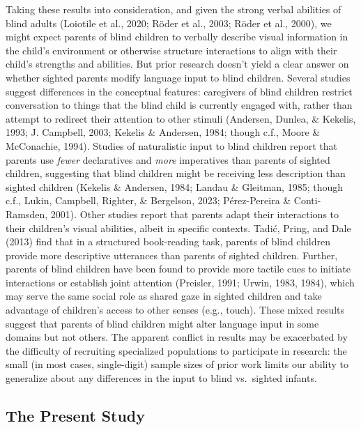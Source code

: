 \documentclass[
  man,floatsintext]{apa6}
\begin{document}
Taking these results into consideration, and given the strong verbal abilities of blind adults (Loiotile et al., 2020; Röder et al., 2003; Röder et al., 2000), we might expect parents of blind children to verbally describe visual information in the child's environment or otherwise structure interactions to align with their child's strengths and abilities. But prior research doesn't yield a clear answer on whether sighted parents modify language input to blind children. Several studies suggest differences in the conceptual features: caregivers of blind children restrict conversation to things that the blind child is currently engaged with, rather than attempt to redirect their attention to other stimuli (Andersen, Dunlea, \& Kekelis, 1993; J. Campbell, 2003; Kekelis \& Andersen, 1984; though c.f., Moore \& McConachie, 1994). Studies of naturalistic input to blind children report that parents use \emph{fewer} declaratives and \emph{more} imperatives than parents of sighted children, suggesting that blind children might be receiving less description than sighted children (Kekelis \& Andersen, 1984; Landau \& Gleitman, 1985; though c.f., Lukin, Campbell, Righter, \& Bergelson, 2023; Pérez-Pereira \& Conti-Ramsden, 2001). Other studies report that parents adapt their interactions to their children's visual abilities, albeit in specific contexts. Tadić, Pring, and Dale (2013) find that in a structured book-reading task, parents of blind children provide more descriptive utterances than parents of sighted children. Further, parents of blind children have been found to provide more tactile cues to initiate interactions or establish joint attention (Preisler, 1991; Urwin, 1983, 1984), which may serve the same social role as shared gaze in sighted children and take advantage of children's access to other senses (e.g., touch). These mixed results suggest that parents of blind children might alter language input in some domains but not others. The apparent conflict in results may be exacerbated by the difficulty of recruiting specialized populations to participate in research: the small (in most cases, single-digit) sample sizes of prior work limits our ability to generalize about any differences in the input to blind vs.~sighted infants.

\hypertarget{the-present-study}{%
\subsection{The Present Study}\label{the-present-study}}
\end{document}
